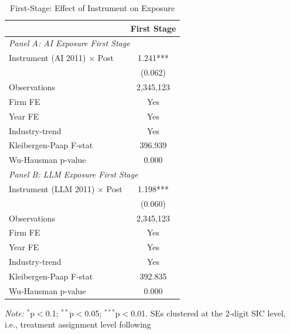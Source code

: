 \begin{table}[!h]
\centering
\caption{First-Stage: Effect of Instrument on Exposure}
\centering
\begin{threeparttable}
\begin{tabular}[t]{lc}
\toprule
 & First Stage\\
\midrule
\multicolumn{2}{l}{\textit{Panel A: AI Exposure First Stage}}\\
\hline
\hspace{1em}Instrument (AI 2011) × Post & 1.241***\\
\hspace{1em} & (0.062)\\
\hspace{1em}Observations & \vphantom{1} 2,345,123\\
\hspace{1em}Firm FE & \vphantom{1} Yes\\
\hspace{1em}Year FE & \vphantom{1} Yes\\
\hspace{1em} Industry-trend & \vphantom{1} Yes\\
\hspace{1em}Kleibergen-Paap F-stat & 396.939 \\
\hspace{1em}Wu-Hausman p-value & \vphantom{1} 0.000\\
\multicolumn{2}{l}{\textit{Panel B: LLM Exposure First Stage}}\\
\hline
\hspace{1em}Instrument (LLM 2011) × Post & 1.198***\\
\hspace{1em} & (0.060)\\
\hspace{1em}Observations & 2,345,123\\
\hspace{1em}Firm FE & Yes\\
\hspace{1em}Year FE & Yes\\
\hspace{1em} Industry-trend & \vphantom{1} Yes\\
\hspace{1em}Kleibergen-Paap F-stat & 392.835\\
\hspace{1em}Wu-Hausman p-value & 0.000\\
\midrule
\midrule
\bottomrule
\end{tabular}
\begin{tablenotes} 
    \item \textit{Note:} $^{*}$p$<$0.1; $^{**}$p$<$0.05; $^{***}$p$<$0.01. SEs clustered at the 2-digit SIC level, i.e., treatment assignment level following \cite{borusyak2025practical} 
\end{tablenotes}
\end{threeparttable}
\end{table}
